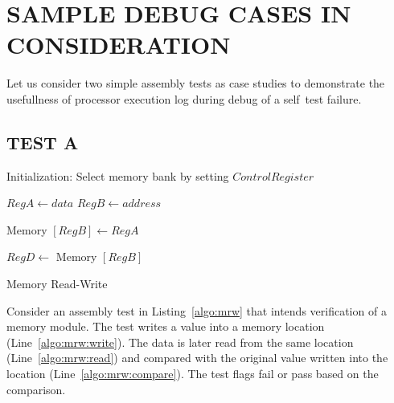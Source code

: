\section {SAMPLE DEBUG CASES IN CONSIDERATION}
Let us consider two simple assembly tests as case studies to demonstrate the usefullness of processor execution log during debug of a self~test failure.
\subsection {TEST A}
\label{case:testa}

\vspace{1.5cm}


\IncMargin{1em}
\begin{algorithm}[h]
\label{algo:mrw}
\DontPrintSemicolon
{}

\BlankLine
Initialization: Select memory bank by setting $Control Register$ \;

	$Reg A \longleftarrow data$\;
	$Reg B \longleftarrow address$\; \label{algo:mrw:write}

	Memory $[Reg B] \longleftarrow Reg A $\;

	$Reg D \longleftarrow$	Memory $[Reg B]$\;  \label{algo:mrw:read}


\caption{Memory Read-Write}
\end{algorithm}\DecMargin{1em}

\vspace{1.5cm}

Consider an assembly test in Listing~\ref{algo:mrw} that intends verification of a memory module. The test writes a value into a memory location (Line~\ref{algo:mrw:write}). The data is later read from the same location (Line~\ref{algo:mrw:read}) and compared with the original value written into the location (Line~\ref{algo:mrw:compare}). The test flags fail or pass based on the comparison.


